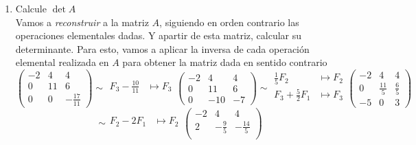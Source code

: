     \begin{enumerate}[label=\listAlph]
        \item Calcule \(\det A\) \\
            Vamos a \emph{reconstruir} a la matriz \(A\), siguiendo en orden contrario las operaciones elementales dadas. 
            Y apartir de esta matriz, calcular su determinante. Para esto, vamos a aplicar la inversa de cada operación elemental realizada en 
            \(A\) para obtener la matriz dada en sentido contrario
            \[
                \begin{pmatrix}
                    -2 & 4 & 4 \\ 
                    0 & 11 & 6 \\ 
                    0 & 0 & -\frac{17}{11}
                \end{pmatrix}
                \sim
                \begin{aligned}
                    F_3 - \frac{10}{11} &\mapsto F_3 \\
                \end{aligned}
                \begin{pmatrix}
                    -2 & 4 & 4 \\ 
                    0 & 11 & 6 \\ 
                    0 & -10 & -7
                \end{pmatrix}
                \sim
                \begin{aligned}
                    \frac{1}{5}F_2 &\mapsto F_2 \\ 
                    F_3 + \frac{5}{2}F_1 &\mapsto F_3 \\
                \end{aligned}
                \begin{pmatrix}
                    -2 & 4 & 4 \\ 
                    0 & \frac{11}{5} & \frac{6}{5} \\ 
                    -5 & 0 & 3
                \end{pmatrix}
            \]
            \[
                \sim
                \begin{aligned}
                    F_2 - 2F_1 &\mapsto F_2 \\ 
                \end{aligned}
                \begin{pmatrix}
                    -2 & 4 & 4 \\ 
                    2 & -\frac{9}{5} & -\frac{14}{5} \\ 

\end{pmatrix}\]
\end{enumerate}
